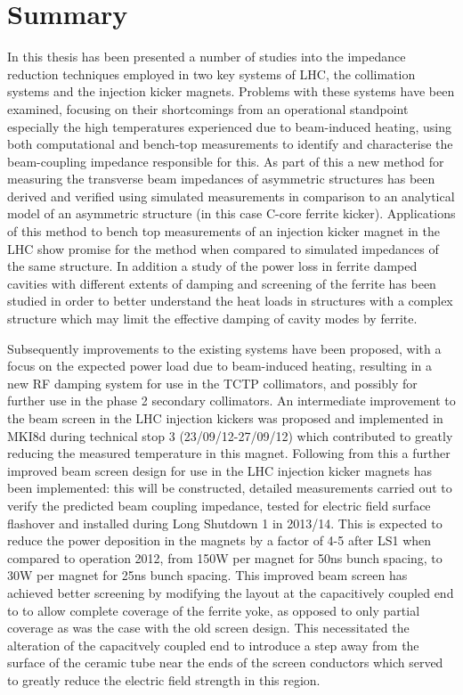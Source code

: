 \label{chap:Con}

\section{Summary}

In this thesis has been presented a number of studies into the impedance reduction techniques employed in two key systems of LHC, the collimation systems and the injection kicker magnets. Problems with these systems have been examined, focusing on their shortcomings from an operational standpoint especially the high temperatures experienced due to beam-induced heating, using both computational and bench-top measurements to identify and characterise the beam-coupling impedance responsible for this. As part of this a new method for measuring the transverse beam impedances of asymmetric structures has been derived and verified using simulated measurements in comparison to an analytical model of an asymmetric structure (in this case C-core ferrite kicker). Applications of this method to bench top measurements of an injection kicker magnet in the LHC show promise for the method when compared to simulated impedances of the same structure. In addition a study of the power loss in ferrite damped cavities with different extents of damping and screening of the ferrite has been studied in order to better understand the heat loads in structures with a complex structure which may limit the effective damping of cavity modes by ferrite.

Subsequently improvements to the existing systems have been proposed, with a focus on the expected power load due to beam-induced heating, resulting in a new RF damping system for use in the TCTP collimators, and possibly for further use in the phase 2 secondary collimators. An intermediate improvement to the beam screen in the LHC injection kickers was proposed and implemented in MKI8d during technical stop 3 (23/09/12-27/09/12) which contributed to greatly reducing the measured temperature in this magnet. Following from this a further improved beam screen design for use in the LHC injection kicker magnets has been implemented: this will be constructed, detailed measurements carried out to verify the predicted beam coupling impedance, tested for electric field surface flashover and installed during Long Shutdown 1 in 2013/14. This is expected to reduce the power deposition in the magnets by a factor of 4-5 after LS1 when compared to operation 2012, from 150W per magnet for 50ns bunch spacing, to 30W per magnet for 25ns bunch spacing. This improved beam screen has achieved better screening by modifying the layout at the capacitively coupled end to to allow complete coverage of the ferrite yoke, as opposed to only partial coverage as was the case with the old screen design. This necessitated the alteration of the capacitvely coupled end to introduce a step away from the surface of the ceramic tube near the ends of the screen conductors which served to greatly reduce the electric field strength in this region.

